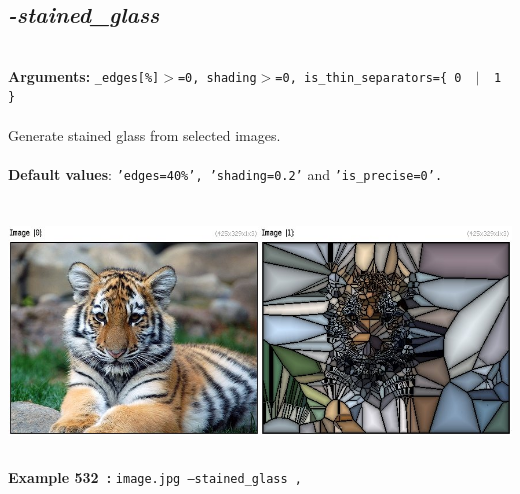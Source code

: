 \documentclass[a4paper,11pt,twoside]{book}
\begin{document}
\subsection{\emph{-stained\_glass} }\vspace*{-0.5em}
~\\\textbf{Arguments: } 
{\small \texttt{\_edges[\%]$>$=0, shading$>$=0, is\_thin\_separators=\{ 0 ~$|$~ 1 \}}}\\~\\
Generate stained glass from selected images.
~\\~\\\textbf{Default values}: {\small \texttt{'edges=40\%', 'shading=0.2'} and \texttt{'is\_precise=0'.}}
\begin{center}\includegraphics[keepaspectratio=true,height=7cm,width=\textwidth]{img/gmic_def532.jpg}\\
{\footnotesize \textbf{Example 532~:} \texttt{image.jpg --stained\_glass ,}}
\end{center}
\end{document}
